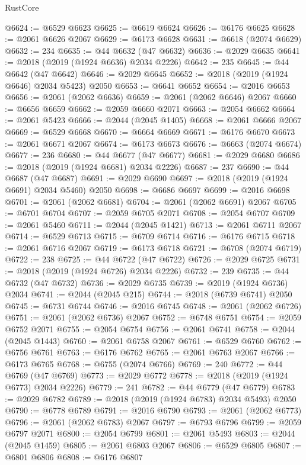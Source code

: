 \begin{lexlean}{RustCore}
\begin{coremodule}
@6624 := @6529 @6623
@6625 := @6619 @6624
@6626 := @6176 @6625
@6628 := @2061 @6626 @2067
@6629 := @6173 @6628
@6631 := @6618 (@2074 @6629)
@6632 := 234
@6635 := @44 @6632 (@47 @6632)
@6636 := @2029 @6635
@6641 := @2018 (@2019 (@1924 @6636) @2034 @2226)
@6642 := 235
@6645 := @44 @6642 (@47 @6642)
@6646 := @2029 @6645
@6652 := @2018 (@2019 (@1924 @6646) @2034 @5423) @2050
@6653 := @6641 @6652
@6654 := @2016 @6653
@6656 := @2061 (@2062 @6636)
@6659 := @2061 (@2062 @6646) @2067
@6660 := @6656 @6659
@6662 := @2059 @6660 @2071
@6663 := @2054 @6662
@6664 := @2061 @5423
@6666 := @2044 (@2045 @1405)
@6668 := @2061 @6666 @2067
@6669 := @6529 @6668
@6670 := @6664 @6669
@6671 := @6176 @6670
@6673 := @2061 @6671 @2067
@6674 := @6173 @6673
@6676 := @6663 (@2074 @6674)
@6677 := 236
@6680 := @44 @6677 (@47 @6677)
@6681 := @2029 @6680
@6686 := @2018 (@2019 (@1924 @6681) @2034 @2226)
@6687 := 237
@6690 := @44 @6687 (@47 @6687)
@6691 := @2029 @6690
@6697 := @2018 (@2019 (@1924 @6691) @2034 @5460) @2050
@6698 := @6686 @6697
@6699 := @2016 @6698
@6701 := @2061 (@2062 @6681)
@6704 := @2061 (@2062 @6691) @2067
@6705 := @6701 @6704
@6707 := @2059 @6705 @2071
@6708 := @2054 @6707
@6709 := @2061 @5460
@6711 := @2044 (@2045 @1421)
@6713 := @2061 @6711 @2067
@6714 := @6529 @6713
@6715 := @6709 @6714
@6716 := @6176 @6715
@6718 := @2061 @6716 @2067
@6719 := @6173 @6718
@6721 := @6708 (@2074 @6719)
@6722 := 238
@6725 := @44 @6722 (@47 @6722)
@6726 := @2029 @6725
@6731 := @2018 (@2019 (@1924 @6726) @2034 @2226)
@6732 := 239
@6735 := @44 @6732 (@47 @6732)
@6736 := @2029 @6735
@6739 := @2019 (@1924 @6736) @2034
@6741 := @2044 (@2045 @215)
@6744 := @2018 (@6739 @6741) @2050
@6745 := @6731 @6744
@6746 := @2016 @6745
@6748 := @2061 (@2062 @6726)
@6751 := @2061 (@2062 @6736) @2067
@6752 := @6748 @6751
@6754 := @2059 @6752 @2071
@6755 := @2054 @6754
@6756 := @2061 @6741
@6758 := @2044 (@2045 @1443)
@6760 := @2061 @6758 @2067
@6761 := @6529 @6760
@6762 := @6756 @6761
@6763 := @6176 @6762
@6765 := @2061 @6763 @2067
@6766 := @6173 @6765
@6768 := @6755 (@2074 @6766)
@6769 := 240
@6772 := @44 @6769 (@47 @6769)
@6773 := @2029 @6772
@6778 := @2018 (@2019 (@1924 @6773) @2034 @2226)
@6779 := 241
@6782 := @44 @6779 (@47 @6779)
@6783 := @2029 @6782
@6789 := @2018 (@2019 (@1924 @6783) @2034 @5493) @2050
@6790 := @6778 @6789
@6791 := @2016 @6790
@6793 := @2061 (@2062 @6773)
@6796 := @2061 (@2062 @6783) @2067
@6797 := @6793 @6796
@6799 := @2059 @6797 @2071
@6800 := @2054 @6799
@6801 := @2061 @5493
@6803 := @2044 (@2045 @1459)
@6805 := @2061 @6803 @2067
@6806 := @6529 @6805
@6807 := @6801 @6806
@6808 := @6176 @6807

\end{coremodule}
\end{lexlean}
